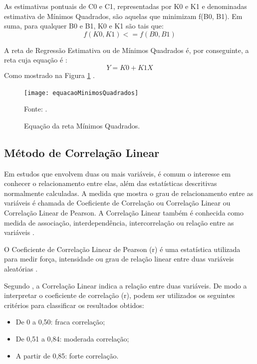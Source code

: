 As estimativas pontuais de C0 e C1, representadas por K0 e K1 e denominadas estimativa de Mínimos Quadrados, são aquelas que minimizam f(B0, B1). Em suma,  para qualquer B0 e B1, K0 e K1 são tais que:
\begin{equation}
f(K0,K1) <= f(B0,B1)
\end{equation}

A reta de Regressão Estimativa ou de Mínimos Quadrados é, por conseguinte, a reta cuja equação é :
\begin{equation}
Y = K0 + K1X 
\end{equation}
Como mostrado na Figura \ref{equacaoMinimos} \cite[pág.~441]{devore2006}.

\graphicspath{{figuras/}}
\begin{figure}[H]
\centering
\texttt{[image: equacaoMinimosQuadrados]}
\caption{Equação da reta Mínimos Quadrados.}{Fonte: .} 
\label{equacaoMinimos}
\end{figure}

\subsection{Método de Correlação Linear}

Em estudos que envolvem duas ou mais variáveis, é comum o interesse em conhecer o relacionamento entre elas, além das estatísticas descritivas normalmente calculadas. A medida que mostra o grau de relacionamento entre as variáveis é chamada de Coeficiente de Correlação ou Correlação Linear ou Correlação Linear de Pearson. A Correlação Linear também é conhecida como medida de associação, interdependência, intercorrelação ou relação entre as variáveis \cite[pág.~62]{lira2004}.

O Coeficiente de Correlação Linear de Pearson (r) é uma estatística utilizada para medir força, intensidade ou grau de relação linear entre duas variáveis aleatórias \cite[pág.~664]{ferreira2009}.

Segundo , a Correlação Linear indica a relação entre duas variáveis. De modo a interpretar o coeficiente de correlação (r), podem ser utilizados os seguintes critérios para classificar os resultados obtidos:

\begin{itemize}
\item De 0 a 0,50: fraca correlação; 
\item De 0,51 a 0,84: moderada correlação;
\item A partir de 0,85: forte correlação.
\end{itemize}

